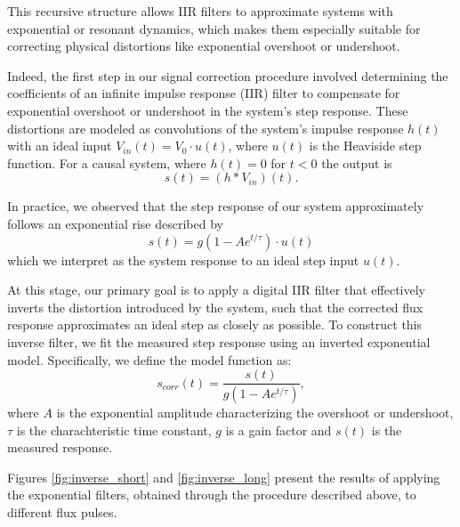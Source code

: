 This recursive structure allows IIR filters to approximate systems with exponential or resonant dynamics, which makes them especially suitable for correcting physical distortions like exponential overshoot or undershoot.

Indeed, the first step in our signal correction procedure involved determining the coefficients of an infinite impulse response (IIR) filter to compensate for exponential overshoot or undershoot in the system’s step response.
These distortions are modeled as convolutions of the system's impulse response $h(t)$ with an ideal input $V_{in}(t) = V_0\cdot u(t)$, where $u(t)$ is the Heaviside step function.
For a causal system, where $h(t)=0$ for $t<0$ the output is 
\begin{equation}
    s(t) = (h \ast V_{in})(t).
\end{equation}

In practice, we observed that the step response of our system approximately follows an exponential rise described by
\begin{equation}
    s(t) = g(1-Ae^{t/\tau})\cdot u(t)
\end{equation}
which we interpret as the system response to an ideal step input $u(t)$. 

At this stage, our primary goal is to apply a digital IIR filter that effectively inverts the distortion introduced by the system, such that the corrected flux response approximates an ideal step as closely as possible.
To construct this inverse filter, we fit the measured step response using an inverted exponential model. Specifically, we define the model function as:
\begin{equation}\label{eq:inverse}
    s_{corr}(t) = \frac{s(t)}{g(1-Ae^{t/\tau})},
\end{equation}
where $A$ is the exponential amplitude characterizing the overshoot or undershoot, $\tau$ is the charachteristic time constant, $g$ is a gain factor and $s(t)$ is the measured response.

Figures \ref{fig:inverse_short} and \ref{fig:inverse_long} present the results of applying the exponential filters, obtained through the procedure described above, to different flux pulses.


